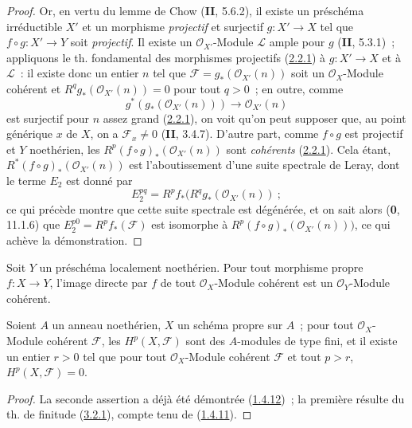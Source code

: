 \begin{proof}
Or, en vertu du lemme de Chow (\textbf{II}, 5.6.2), il existe un préschéma
irréductible $X'$ et un morphisme \emph{projectif} et surjectif
$g:X'\to X$ tel que $f\circ g:X'\to Y$ soit \emph{projectif}. Il existe un
$\mathcal O_{X'}$-Module $\mathcal L$ ample pour $g$ (\textbf{II}, 5.3.1)~;
appliquons le th. fondamental des morphismes projectifs
(\hyperref[III.2.2.1-fr]{2.2.1}) à $g:X'\to X$ et à $\mathcal L$~: il
existe donc un entier $n$ tel que
$\mathcal F=g_*(\mathcal O_{X'}(n))$ soit un $\mathcal O_X$-Module cohérent
et $R^qg_*(\mathcal O_{X'}(n))=0$ pour tout $q>0$~; en outre, comme
\[
g^*(g_*(\mathcal O_{X'}(n)))\longrightarrow\mathcal O_{X'}(n)
\]
est surjectif pour $n$ assez grand (\hyperref[III.2.2.1-fr]{2.2.1}), on
voit qu'on peut supposer que, au point générique $x$ de $X$, on a
$\mathcal F_x\neq0$ (\textbf{II}, 3.4.7). D'autre part, comme $f\circ g$ est
projectif et $Y$ noethérien, les
$R^p(f\circ g)_*(\mathcal O_{X'}(n))$ sont \emph{cohérents}
(\hyperref[III.2.2.1-fr]{2.2.1}). Cela étant,
$R^*(f\circ g)_*(\mathcal O_{X'}(n))$ est l'aboutissement d'une suite
spectrale de Leray, dont le terme $E_2$ est donné par
\[
E_2^{pq}=R^pf_*(R^qg_*(\mathcal O_{X'}(n))~;
\]
ce qui précède montre que cette suite spectrale est dégénérée, et on sait
alors (\textbf{0}, 11.1.6) que $E_2^{p0}=R^pf_*(\mathcal F)$ est isomorphe à
$R^p(f\circ g)_*(\mathcal O_{X'}(n)))$, ce qui achève la démonstration.
\end{proof}

\begin{corollary}[3.2.2]
\label{III.3.2.2-fr}
Soit $Y$ un préschéma localement noethérien. Pour tout morphisme propre
$f:X\to Y$, l'image directe par $f$ de tout $\mathcal O_X$-Module cohérent
est un $\mathcal O_Y$-Module cohérent.
\end{corollary}

\begin{corollary}[3.2.3]
\label{III.3.2.3-fr}
Soient $A$ un anneau noethérien, $X$ un schéma propre sur $A$~; pour tout
$\mathcal O_X$-Module cohérent $\mathcal F$, les $H^p(X,\mathcal F)$ sont
des $A$-modules de type fini, et il existe un entier $r>0$ tel que pour tout
$\mathcal O_X$-Module cohérent $\mathcal F$ et tout $p>r$,
$H^p(X,\mathcal F)=0$.
\end{corollary}

\begin{proof}
La seconde assertion a déjà été démontrée
(\hyperref[III.1.4.12-fr]{1.4.12})~; la première résulte du th. de finitude
(\hyperref[III.3.2.1-fr]{3.2.1}), compte tenu de
(\hyperref[III.1.4.11-fr]{1.4.11}).
\end{proof}


